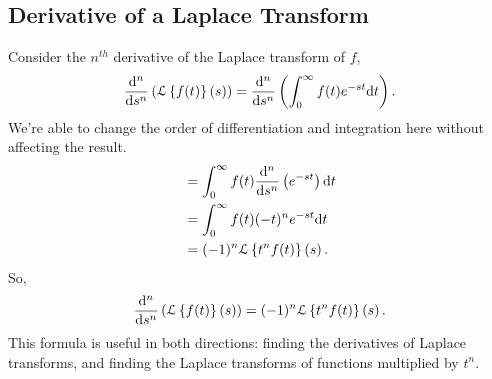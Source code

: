 \subsection{Derivative of a Laplace Transform}
\noindent
Consider the $n^{th}$ derivative of the Laplace transform of $f$,
\begin{equation*}
	\frac{\mathrm{d}^n}{\mathrm{d}s^n}\left(\mathcal{L}\left\{ f(t) \right\}\left(s\right)\right) = \frac{\mathrm{d}^n}{\mathrm{d}s^n}\left(\int_{0}^{\infty}{f(t)e^{-st} \mathrm{d}t}\right).
\end{equation*}
We're able to change the order of differentiation and integration here without affecting the result.
\begin{align*}
	&= \int_{0}^{\infty}{f(t)\frac{\mathrm{d}^n}{\mathrm{d}s^n}\left(e^{-st}\right) \mathrm{d}t} \\
	&= \int_{0}^{\infty}{f(t)(-t)^ne^{-st} \mathrm{d}t} \\
	&= (-1)^n\mathcal{L}\left\{ t^nf(t) \right\}\left(s\right).
\end{align*}
So,
\begin{equation*}
	\frac{\mathrm{d}^n}{\mathrm{d}s^n}\left(\mathcal{L}\left\{ f(t) \right\}\left(s\right)\right) = (-1)^n\mathcal{L}\left\{ t^nf(t) \right\}\left(s\right).
\end{equation*}
This formula is useful in both directions: finding the derivatives of Laplace transforms, and finding the Laplace transforms of functions multiplied by $t^n$.
